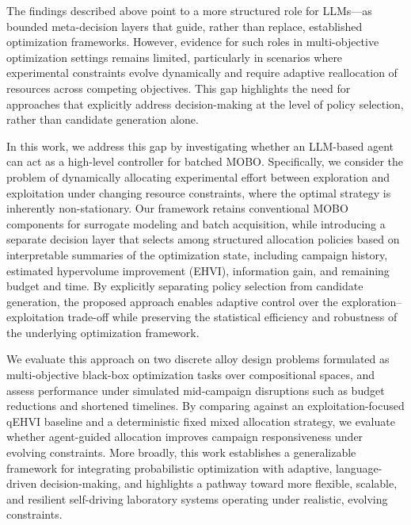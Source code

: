 The findings described above point to a more structured role for LLMs—as bounded meta-decision layers that guide, rather than replace, established optimization frameworks. However, evidence for such roles in multi-objective optimization settings remains limited, particularly in scenarios where experimental constraints evolve dynamically and require adaptive reallocation of resources across competing objectives. This gap highlights the need for approaches that explicitly address decision-making at the level of policy selection, rather than candidate generation alone.

In this work, we address this gap by investigating whether an LLM-based agent can act as a high-level controller for batched MOBO. Specifically, we consider the problem of dynamically allocating experimental effort between exploration and exploitation under changing resource constraints, where the optimal strategy is inherently non-stationary. Our framework retains conventional MOBO components for surrogate modeling and batch acquisition, while introducing a separate decision layer that selects among structured allocation policies based on interpretable summaries of the optimization state, including campaign history, estimated hypervolume improvement (EHVI), information gain, and remaining budget and time. By explicitly separating policy selection from candidate generation, the proposed approach enables adaptive control over the exploration–exploitation trade-off while preserving the statistical efficiency and robustness of the underlying optimization framework. 

We evaluate this approach on two discrete alloy design problems formulated as multi-objective black-box optimization tasks over compositional spaces, and assess performance under simulated mid-campaign disruptions such as budget reductions and shortened timelines. By comparing against an exploitation-focused qEHVI baseline and a deterministic fixed mixed allocation strategy, we evaluate whether agent-guided allocation improves campaign responsiveness under evolving constraints. More broadly, this work establishes a generalizable framework for integrating probabilistic optimization with adaptive, language-driven decision-making, and highlights a pathway toward more flexible, scalable, and resilient self-driving laboratory systems operating under realistic, evolving constraints.


